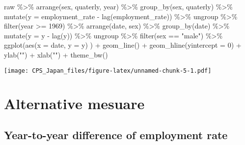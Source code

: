 \documentclass[
]{book}
\newenvironment{Shaded}{\begin{snugshade}}{\end{snugshade}}
\newcommand{\AttributeTok}[1]{\textcolor[rgb]{0.77,0.63,0.00}{#1}}
\newcommand{\DecValTok}[1]{\textcolor[rgb]{0.00,0.00,0.81}{#1}}
\newcommand{\FunctionTok}[1]{\textcolor[rgb]{0.00,0.00,0.00}{#1}}
\newcommand{\NormalTok}[1]{#1}
\newcommand{\SpecialCharTok}[1]{\textcolor[rgb]{0.00,0.00,0.00}{#1}}
\newcommand{\StringTok}[1]{\textcolor[rgb]{0.31,0.60,0.02}{#1}}
\begin{document}
\begin{Shaded}
\begin{Highlighting}[]
\NormalTok{raw }\SpecialCharTok{\%\textgreater{}\%}
  \FunctionTok{arrange}\NormalTok{(sex,}
\NormalTok{          quaterly,}
\NormalTok{          year) }\SpecialCharTok{\%\textgreater{}\%}
  \FunctionTok{group\_by}\NormalTok{(sex,}
\NormalTok{           quaterly) }\SpecialCharTok{\%\textgreater{}\%}
  \FunctionTok{mutate}\NormalTok{(}\AttributeTok{y =}\NormalTok{ employment\_rate }\SpecialCharTok{{-}} \FunctionTok{lag}\NormalTok{(employment\_rate)) }\SpecialCharTok{\%\textgreater{}\%}
\NormalTok{  ungroup }\SpecialCharTok{\%\textgreater{}\%}
  \FunctionTok{filter}\NormalTok{(year }\SpecialCharTok{\textgreater{}=} \DecValTok{1969}\NormalTok{) }\SpecialCharTok{\%\textgreater{}\%}
  \FunctionTok{arrange}\NormalTok{(date,}
\NormalTok{          sex) }\SpecialCharTok{\%\textgreater{}\%}
  \FunctionTok{group\_by}\NormalTok{(date) }\SpecialCharTok{\%\textgreater{}\%}
  \FunctionTok{mutate}\NormalTok{(}\AttributeTok{y =}\NormalTok{ y }\SpecialCharTok{{-}} \FunctionTok{lag}\NormalTok{(y)) }\SpecialCharTok{\%\textgreater{}\%}
\NormalTok{  ungroup }\SpecialCharTok{\%\textgreater{}\%}
  \FunctionTok{filter}\NormalTok{(sex }\SpecialCharTok{==} \StringTok{"male"}\NormalTok{) }\SpecialCharTok{\%\textgreater{}\%}
  \FunctionTok{ggplot}\NormalTok{(}\FunctionTok{aes}\NormalTok{(}\AttributeTok{x =}\NormalTok{ date,}
             \AttributeTok{y =}\NormalTok{ y)}
\NormalTok{         ) }\SpecialCharTok{+}
  \FunctionTok{geom\_line}\NormalTok{() }\SpecialCharTok{+}
  \FunctionTok{geom\_hline}\NormalTok{(}\AttributeTok{yintercept =} \DecValTok{0}\NormalTok{) }\SpecialCharTok{+}
  \FunctionTok{ylab}\NormalTok{(}\StringTok{""}\NormalTok{) }\SpecialCharTok{+}
  \FunctionTok{xlab}\NormalTok{(}\StringTok{""}\NormalTok{) }\SpecialCharTok{+}
  \FunctionTok{theme\_bw}\NormalTok{()}
\end{Highlighting}
\end{Shaded}

\texttt{[image: CPS\_Japan\_files/figure-latex/unnamed-chunk-5-1.pdf]}

\hypertarget{alternative-mesuare}{%
\chapter{Alternative mesuare}\label{alternative-mesuare}}

\hypertarget{year-to-year-difference-of-employment-rate-1}{%
\section{Year-to-year difference of employment rate}\label{year-to-year-difference-of-employment-rate-1}}
\end{document}
